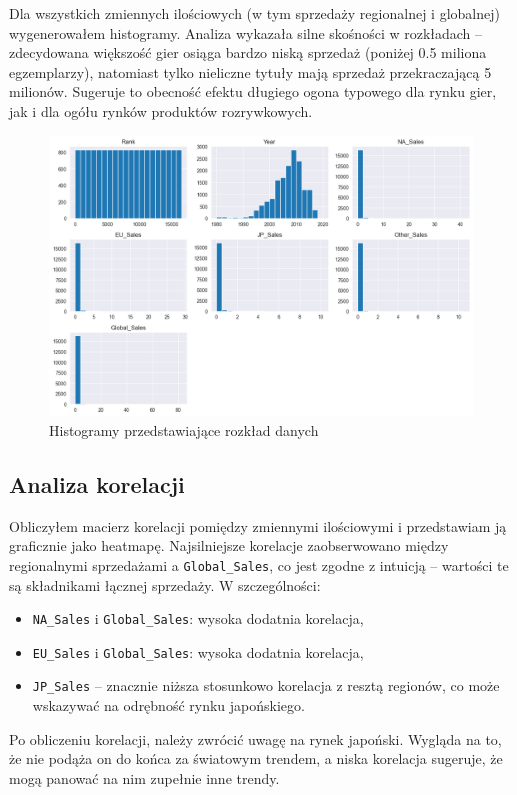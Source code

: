 \documentclass[11pt]{article}
\begin{document}
Dla wszystkich zmiennych ilościowych (w tym sprzedaży regionalnej i globalnej) wygenerowałem histogramy.
Analiza wykazała silne skośności w rozkładach -- zdecydowana większość gier osiąga bardzo niską sprzedaż (poniżej 0.5 miliona egzemplarzy),
natomiast tylko nieliczne tytuły mają sprzedaż przekraczającą 5 milionów.
Sugeruje to obecność efektu długiego ogona typowego dla rynku gier, jak i dla ogółu rynków produktów rozrywkowych.

\begin{figure}[H]
    \centering
    \includegraphics[width=0.5\linewidth]{figures/histogramy}
    \caption{Histogramy przedstawiające rozkład danych}
    \label{fig:histogramy}
\end{figure}

\subsection{Analiza korelacji}\label{subsec:analiza-korelacji}

Obliczyłem macierz korelacji pomiędzy zmiennymi ilościowymi i przedstawiam ją graficznie jako heatmapę.
Najsilniejsze korelacje zaobserwowano między regionalnymi sprzedażami a \texttt{Global\_Sales},
co jest zgodne z intuicją – wartości te są składnikami łącznej sprzedaży.
W szczególności:
\begin{itemize}
  \item \texttt{NA\_Sales} i \texttt{Global\_Sales}: wysoka dodatnia korelacja,
  \item \texttt{EU\_Sales} i \texttt{Global\_Sales}: wysoka dodatnia korelacja,
  \item \texttt{JP\_Sales} – znacznie niższa stosunkowo korelacja z resztą regionów, co może wskazywać na odrębność rynku japońskiego.
\end{itemize}

Po obliczeniu korelacji, należy zwrócić uwagę na rynek japoński.
Wygląda na to, że nie podąża on do końca za światowym trendem,
a niska korelacja sugeruje, że mogą panować na nim zupełnie inne trendy.
\end{document}
